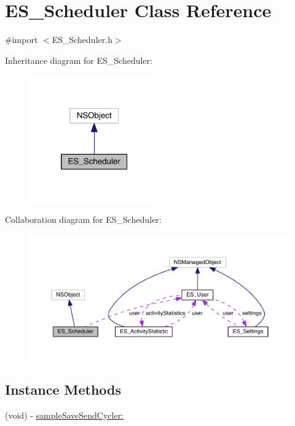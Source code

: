 \hypertarget{interface_e_s___scheduler}{\section{E\+S\+\_\+\+Scheduler Class Reference}
\label{interface_e_s___scheduler}
}


{\ttfamily \#import $<$E\+S\+\_\+\+Scheduler.\+h$>$}



Inheritance diagram for E\+S\+\_\+\+Scheduler\+:\nopagebreak
\begin{figure}[H]
\begin{center}
\leavevmode
\includegraphics[width=158pt]{df/d89/interface_e_s___scheduler__inherit__graph}
\end{center}
\end{figure}


Collaboration diagram for E\+S\+\_\+\+Scheduler\+:\nopagebreak
\begin{figure}[H]
\begin{center}
\leavevmode
\includegraphics[width=350pt]{dc/de9/interface_e_s___scheduler__coll__graph}
\end{center}
\end{figure}
\subsection*{Instance Methods}
\begin{DoxyCompactItemize}
\item 
(void) -\/ \hyperlink{interface_e_s___scheduler_a11900a1a578cfa6c270d8406d658a961}{sample\+Save\+Send\+Cycler\+:}
\end{DoxyCompactItemize}

